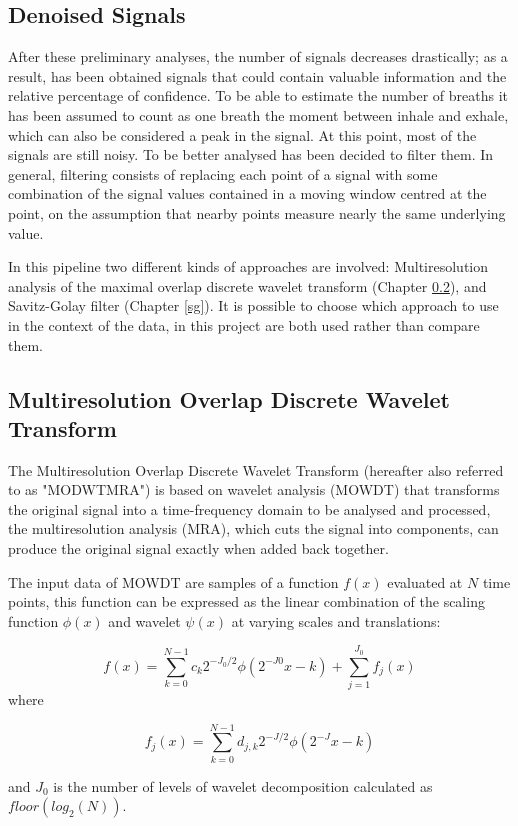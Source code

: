 \subsection{Denoised Signals}
After these preliminary analyses, the number of signals decreases drastically; as a result, has been obtained signals that could contain valuable information and the relative percentage of confidence.
To be able to estimate the number of breaths it has been assumed to count as one breath the moment between inhale and exhale, which can also be considered a peak in the signal.
At this point, most of the signals are still noisy. To be better analysed has been decided to filter them. In general, filtering consists of replacing each point of a signal with some combination of the signal values contained in a moving window centred at the point, on the assumption that nearby points measure nearly the same underlying value.

In this pipeline two different kinds of approaches are involved: Multiresolution analysis of the maximal overlap discrete wavelet transform (Chapter \ref{Wavelet}), and Savitz-Golay filter (Chapter \ref{sg}).
It is possible to choose which approach to use in the context of the data, in this project are both used rather than compare them.


\subsection{Multiresolution Overlap Discrete Wavelet Transform} \label{Wavelet}

The Multiresolution Overlap Discrete Wavelet Transform (hereafter also referred to as "MODWTMRA") is based on wavelet analysis (MOWDT) that transforms the original signal into a time-frequency domain to be analysed and processed, the multiresolution analysis (MRA), which cuts the signal into components, can produce the original signal exactly when added back together.

The input data of MOWDT are samples of a function $f(x)$ evaluated at $N$ time points, this function can be expressed as the linear combination of the scaling function $\phi(x)$ and wavelet $\psi(x)$ at varying scales and translations:

$$f(x)=\sum_{k=0}^{N-1} c_k 2^{-J_0/2} \phi(2^{-J0}x-k) + \sum_{j=1}^{J_0}f_j(x)$$
where 

$$f_j(x)=\sum_{k=0}^{N-1} d_{j,k}2^{-J/2} \phi(2^{-J}x-k)$$

and $J_0$ is the number of levels of wavelet decomposition calculated as $floor(log_2(N))$.

